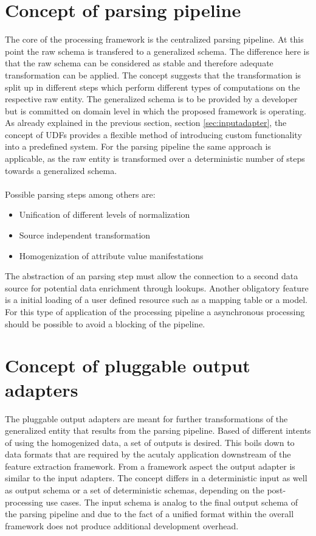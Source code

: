 \section{Concept of parsing pipeline}

The core of the processing framework is the centralized parsing pipeline. At this point the raw schema is transfered to a generalized schema. The difference here is that the raw schema can be considered as stable and therefore adequate transformation can be applied. The concept suggests that the transformation is split up in different steps which perform different types of computations on the respective raw entity. The generalized schema is to be provided by a developer but is committed on domain level in which the proposed framework is operating. As already explained in the previous section, section \ref{sec:inputadapter}, the concept of UDFs provides a flexible method of introducing custom functionality into a predefined system. For the parsing pipeline the same approach is applicable, as the raw entity is transformed over a deterministic number of steps towards a generalized schema. 
\\\\
Possible parsing steps among others are:
\begin{itemize}
\item Unification of different levels of normalization
\item Source independent transformation
\item Homogenization of attribute value manifestations
\end{itemize}

The abstraction of an parsing step must allow the connection to a second data source for potential data enrichment through lookups. Another obligatory feature is a initial loading of a user defined resource such as a mapping table or a model. For this type of application of the processing pipeline a asynchronous processing should be possible to avoid a blocking of the pipeline.

\section{Concept of pluggable output adapters\label{sec:componentsoutput}}

The pluggable output adapters are meant for further transformations of the generalized entity that results from the parsing pipeline. Based of different intents of using the homogenized data, a set of outputs is desired. This boils down to data formats that are required by the acutaly application downstream of the feature extraction framework. From a framework aspect the output adapter is similar to the input adapters. The concept differs in a deterministic input as well as output schema or a set of deterministic schemas, depending on the post-processing use cases. The input schema is analog to the final output schema of the parsing pipeline and due to the fact of a unified format within the overall framework does not produce additional development overhead. 

